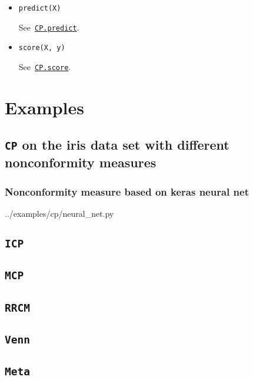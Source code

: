 \documentclass[twoside,11pt]{article}
\begin{document}
\begin{appendices}
\begin{itemize}
        \item
          \texttt{predict(X)}

          See~\hyperref[itm:cp_predict]
          {\texttt{CP.predict}}.
          \\

        \item
          \texttt{score(X, y)}

          See~\hyperref[itm:cp_score]
          {\texttt{CP.score}}.
          \\

      \end{itemize}

  \lstset{%
    basicstyle=\footnotesize,
    numbers = left,
    firstnumber = 0,
    stepnumber = 5,
    frame = single,
    breaklines = true,
  }

  \section{Examples}
  \label{appendix:b}

  \subsection{\texttt{CP} on the iris data set with
              different nonconformity measures}

  

  \subsubsection{Nonconformity measure based on keras
                 neural net}

  
  {../examples/cp/neural_net.py}

  \subsection{\texttt{ICP}}

  \subsection{\texttt{MCP}}

  \subsection{\texttt{RRCM}}

  \subsection{\texttt{Venn}}

  \subsection{\texttt{Meta}}

\end{appendices}


\end{document}
